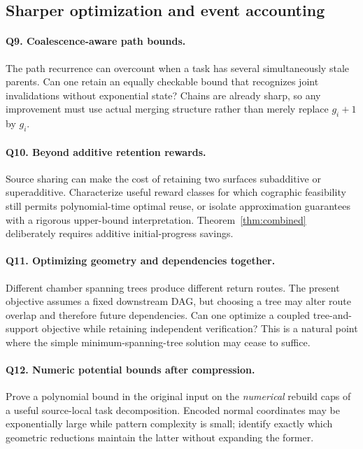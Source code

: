 \documentclass[11pt]{article}
\theoremstyle{definition}
\begin{document}
\subsection{Sharper optimization and event accounting}
\paragraph{Q9. Coalescence-aware path bounds.}
The path recurrence can overcount when a task has several simultaneously stale parents. Can one retain an equally checkable bound that recognizes joint invalidations without exponential state? Chains are already sharp, so any improvement must use actual merging structure rather than merely replace $g_i+1$ by $g_i$.

\paragraph{Q10. Beyond additive retention rewards.}
Source sharing can make the cost of retaining two surfaces subadditive or superadditive. Characterize useful reward classes for which cographic feasibility still permits polynomial-time optimal reuse, or isolate approximation guarantees with a rigorous upper-bound interpretation. Theorem~\ref{thm:combined} deliberately requires additive initial-progress savings.

\paragraph{Q11. Optimizing geometry and dependencies together.}
Different chamber spanning trees produce different return routes. The present objective assumes a fixed downstream DAG, but choosing a tree may alter route overlap and therefore future dependencies. Can one optimize a coupled tree-and-support objective while retaining independent verification? This is a natural point where the simple minimum-spanning-tree solution may cease to suffice.

\paragraph{Q12. Numeric potential bounds after compression.}
Prove a polynomial bound in the original input on the \emph{numerical} rebuild caps of a useful source-local task decomposition. Encoded normal coordinates may be exponentially large while pattern complexity is small; identify exactly which geometric reductions maintain the latter without expanding the former.
\end{document}
